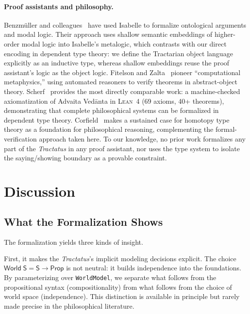 \documentclass[jsl,bibother]{asl}
\theoremstyle{definition}
\theoremstyle{remark}
\newcommand{\Sach}{\mathsf{S}}
\newcommand{\World}{\mathsf{World}}
\newcommand{\Prop}{\mathsf{Prop}}
\newcommand{\Lean}{\textsc{Lean}}
\begin{document}
\paragraph{Proof assistants and philosophy.}
Benzm\"uller and colleagues~\cite{benzmuller2017} have used
Isabelle to formalize ontological arguments and modal logic.
Their approach uses shallow semantic embeddings of higher-order
modal logic into Isabelle's metalogic, which contrasts with our
direct encoding in dependent type theory: we define the
Tractarian object language explicitly as an inductive type,
whereas shallow embeddings reuse the proof assistant's logic
as the object logic.
Fitelson and Zalta~\cite{fitelson2007} pioneer ``computational
metaphysics,'' using automated reasoners to verify theorems
in abstract-object theory.
Scherf~\cite{scherf2025} provides the most directly comparable
work: a machine-checked axiomatization of Advaita Ved\=anta in
\Lean~4 (69 axioms, 40+ theorems), demonstrating that complete
philosophical systems can be formalized in dependent type
theory.
Corfield~\cite{corfield2020} makes a sustained case for
homotopy type theory as a foundation for philosophical
reasoning, complementing the formal-verification approach
taken here.
To our knowledge, no prior work formalizes any part of the
\emph{Tractatus} in any proof assistant, nor uses the type
system to isolate the saying/showing boundary as a provable
constraint.

\section{Discussion}
\label{sec:discussion}

\subsection{What the Formalization Shows}
\label{sec:shows}

The formalization yields three kinds of insight.

First, it makes the \emph{Tractatus}'s implicit modeling
decisions explicit.  The choice $\World\;\Sach = \Sach \to
\Prop$ is not neutral: it builds independence into the
foundations.  By parameterizing over \texttt{WorldModel}, we
separate what follows from the propositional syntax (compositionality)
from what follows from the choice of world space (independence).
This distinction is available in principle but rarely made
precise in the philosophical literature.
\end{document}
